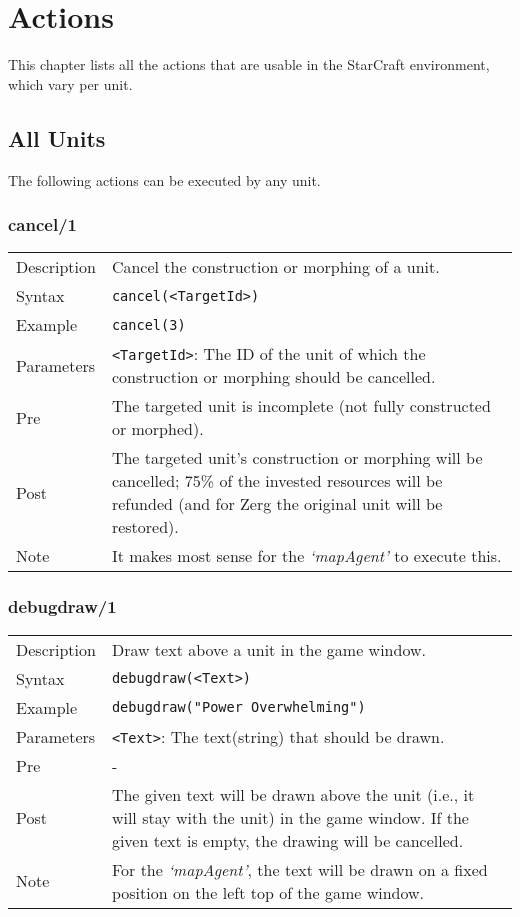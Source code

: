 \chapter{Actions}

This chapter lists all the actions that are usable in the StarCraft environment, which vary per unit.

\section{All Units}
The following actions can be executed by any unit.

\subsection{cancel/1}
\begin{tabularx}{\textwidth}{lX}
 Description & Cancel the construction or morphing of a unit. \\
 Syntax & \verb|cancel(<TargetId>)| \\
 Example & \verb|cancel(3)| \\
 Parameters & \verb|<TargetId>|: The ID of the unit of which the construction or morphing should be cancelled. \\
 Pre & The targeted unit is incomplete (not fully constructed or morphed). \\
 Post & The targeted unit's construction or morphing will be cancelled; 75\% of the invested resources will be refunded (and for Zerg the original unit will be restored). \\
 Note & It makes most sense for the \textit{`mapAgent'} to execute this.
\end{tabularx}

\subsection{debugdraw/1}
\begin{tabularx}{\textwidth}{lX}
 Description & Draw text above a unit in the game window. \\
 Syntax & \verb|debugdraw(<Text>)| \\
 Example & \verb|debugdraw("Power Overwhelming")| \\
 Parameters & \verb|<Text>|: The text(string) that should be drawn. \\
 Pre & - \\
 Post & The given text will be drawn above the unit (i.e., it will stay with the unit) in the game window. If the given text is empty, the drawing will be cancelled. \\
 Note & For the \textit{`mapAgent'}, the text will be drawn on a fixed position on the left top of the game window.
\end{tabularx}

